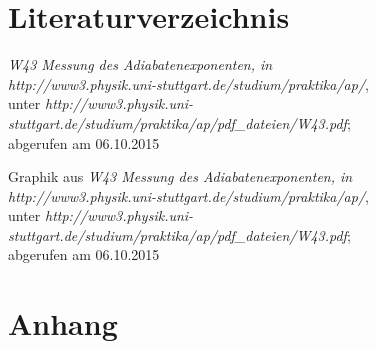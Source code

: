 \documentclass[fontsize=12pt]{scrartcl}
\begin{document}
\section{Literaturverzeichnis}

\renewcommand{\refname}{~}
\vspace{-30pt}
\begin{thebibliography}{xx}

     	\textit{\glqq  W43 Messung des Adiabatenexponenten\grqq , in 	\\
   					http://www3.physik.uni-stuttgart.de/studium/praktika/ap/}, \\
   					unter \textit{http://www3.physik.uni-stuttgart.de/studium/praktika/ap/pdf\_dateien/W43.pdf}; \\
   								abgerufen am 06.10.2015

     	Graphik aus \textit{\glqq  W43 Messung des Adiabatenexponenten\grqq , in 	\\
   					http://www3.physik.uni-stuttgart.de/studium/praktika/ap/}, \\
   					unter \textit{http://www3.physik.uni-stuttgart.de/studium/praktika/ap/pdf\_dateien/W43.pdf}; \\
   								abgerufen am 06.10.2015
\end{thebibliography}

\section{Anhang}
\end{document}
